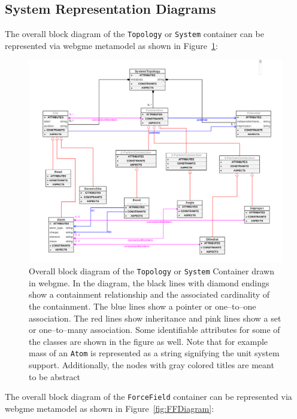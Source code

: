 \documentclass[12pt]{article}
\begin{document}
\subsection{System Representation Diagrams}
The overall block diagram of the \texttt{Topology} or \texttt{System} container can be represented via webgme metamodel as shown in Figure~\ref{fig:TopoDiagram}:

\begin{figure}[ht]
    \centering
    \includegraphics[width=\textwidth]{docs/topo}
    \caption{Overall block diagram of the \texttt{Topology} or \texttt{System} Container drawn in webgme. In the diagram, the black lines with diamond endings show a containment relationship and the associated cardinality of the containment. The blue lines show a pointer or one--to--one association. The red lines show inheritance and pink lines show a set or one--to--many association. Some identifiable attributes for some of the classes are shown in the figure as well. Note that for example mass of an \texttt{Atom} is represented as a string signifying the unit system support. Additionally, the nodes with gray colored titles are meant to be abstract}
    \label{fig:TopoDiagram}
\end{figure}

The overall block diagram of the \texttt{ForceField} container can be represented via webgme metamodel as shown in Figure~\ref{fig:FFDiagram}:
\end{document}

